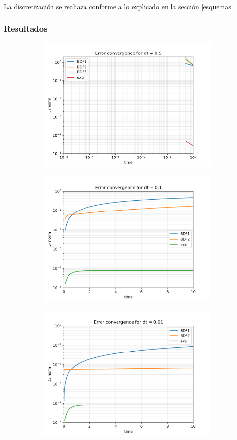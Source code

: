 \documentclass[12pt]{article}
\begin{document}
La discretización se realiaza conforme a lo explicado en la sección \ref{esquemas}  

\subsubsection{Resultados }
\begin{figure}
	\centering
	\begin{subfigure}[b]{0.4\textwidth}
		\centering
		\includegraphics[width=0.7\linewidth]{res/no_homogeneo/L2norm_dt_0.5}
		\caption{}
		\label{fig:l2normdt0.5}
	\end{subfigure}
	\begin{subfigure}[b]{0.4\textwidth}
		\centering
		\includegraphics[width=0.7\linewidth]{res/no_homogeneo/L2norm_dt_0.1}
		\caption{}
		\label{fig:l2normdt0.1}
	\end{subfigure}
	\begin{subfigure}[b]{0.4\textwidth}
		\centering
		\includegraphics[width=0.7\linewidth]{res/no_homogeneo/L2norm_dt_0.01}

\end{subfigure}
\end{figure}
\end{document}
